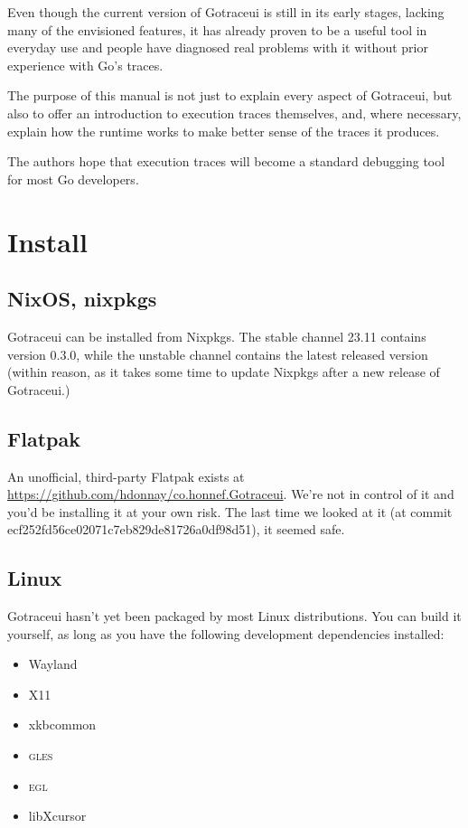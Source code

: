 \documentclass[10pt,letterpaper,oneside,openany,english]{memoir}
\newcommand{\code}[1]{{\ttfamily\mbox{#1}}}
\begin{document}
Even though the current version of Gotraceui is still in its early stages,
lacking many of the envisioned features,
it has already proven to be a useful tool in everyday use
and people have diagnosed real problems with it without prior experience with Go's traces.

The purpose of this manual is not just to explain every aspect of Gotraceui,
but also to offer an introduction to execution traces themselves,
and, where necessary, explain how the runtime works to make better sense of the traces it produces.

The authors hope that execution traces will become a standard debugging tool for most Go developers.

\chapter{Install}

\section*{NixOS, nixpkgs}

Gotraceui can be installed from Nixpkgs.
The stable channel \code{23.11} contains version 0.3.0,
while the unstable channel contains the latest released version
(within reason, as it takes some time to update Nixpkgs after a new release of Gotraceui.)

\section*{Flatpak}

An unofficial, third-party Flatpak exists at \url{https://github.com/hdonnay/co.honnef.Gotraceui}.
We're not in control of it and you'd be installing it at your own risk.
The last time we looked at it (at commit \code{ecf252fd56ce02071c7eb829de81726a0df98d51}), it seemed safe.

\section*{Linux}

Gotraceui hasn't yet been packaged by most Linux distributions.
You can build it yourself, as long as you have the following development dependencies installed:

\begin{itemize}
\item Wayland
\item X11
\item xkbcommon
\item \textsc{gles}
\item \textsc{egl}
\item libXcursor
\end{itemize}
\end{document}
